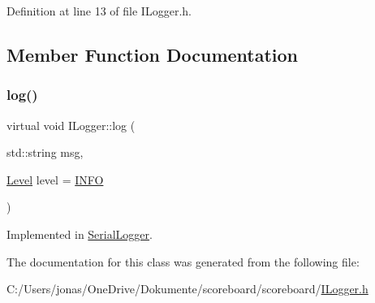 Definition at line 13 of file I\+Logger.\+h.



\subsection{Member Function Documentation}
\mbox{\label{class_i_logger_ad7ebc4b8b6a509f4c3b973343c5fc1f1}} 
\subsubsection{\texorpdfstring{log()}{log()}}
{\footnotesize\ttfamily virtual void I\+Logger\+::log (\begin{DoxyParamCaption}\item[{std\+::string}]{msg,  }\item[{\hyperlink{class_i_logger_af129a40b0950160d0fe6c6b675d9d761}{Level}}]{level = {\ttfamily \hyperlink{class_i_logger_af129a40b0950160d0fe6c6b675d9d761a1de9525e76b4d18631d4371fb0e4697c}{I\+N\+FO}} }\end{DoxyParamCaption})\hspace{0.3cm}{\ttfamily [pure virtual]}}



Implemented in \hyperlink{class_serial_logger_acb71040c5d7d693cecfd08c1013449dc}{Serial\+Logger}.



The documentation for this class was generated from the following file\+:\begin{DoxyCompactItemize}
\item 
C\+:/\+Users/jonas/\+One\+Drive/\+Dokumente/scoreboard/scoreboard/\hyperlink{_i_logger_8h}{I\+Logger.\+h}\end{DoxyCompactItemize}
